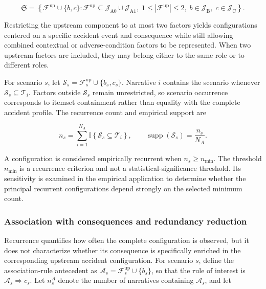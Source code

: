 \[
\mathfrak S
=
\left\{
\mathcal F^{\mathrm{up}}\cup\{b,c\} :
\mathcal F^{\mathrm{up}}
\subseteq
\mathcal J_{\mathrm{A0}}\cup\mathcal J_{\mathrm{A1}},
\;
1\leq|\mathcal F^{\mathrm{up}}|\leq2,
\;
b\in\mathcal J_{\mathrm B},
\;
c\in\mathcal J_{\mathrm C}
\right\}.
\]

Restricting the upstream component to at most two factors yields configurations
centered on a specific accident event and consequence while still allowing
combined contextual or adverse-condition factors to be represented. When two
upstream factors are included, they may belong either to the same role or to
different roles.

For scenario \(s\), let
\(\mathcal S_s=\mathcal F_s^{\mathrm{up}}\cup\{b_s,c_s\}\).
Narrative \(i\) contains the scenario whenever
\(\mathcal S_s\subseteq\mathcal T_i\). Factors outside
\(\mathcal S_s\) remain unrestricted, so scenario occurrence corresponds to
itemset containment rather than equality with the complete accident profile.
The recurrence count and empirical support are

\[
n_s
=
\sum_{i=1}^{N_A}
\mathbb I
\left\{
\mathcal S_s\subseteq\mathcal T_i
\right\},
\qquad
\widehat{\operatorname{supp}}(\mathcal S_s)
=
\frac{n_s}{N_A}.
\]

A configuration is considered empirically recurrent when
\(n_s\geq n_{\min}\). The threshold \(n_{\min}\) is a recurrence criterion and
not a statistical-significance threshold. Its sensitivity is examined in the
empirical application to determine whether the principal recurrent
configurations depend strongly on the selected minimum count.


\subsubsection{Association with consequences and redundancy reduction}
\label{sec:chap4_scenario_measures}

Recurrence quantifies how often the complete configuration is observed, but it
does not characterize whether its consequence is specifically enriched in the
corresponding upstream accident configuration. For scenario \(s\), define the
association-rule antecedent as
\(\mathcal A_s=\mathcal F_s^{\mathrm{up}}\cup\{b_s\}\), so that the rule of
interest is \(\mathcal A_s\Rightarrow c_s\). Let \(n_s^A\) denote the number
of narratives containing \(\mathcal A_s\), and let

